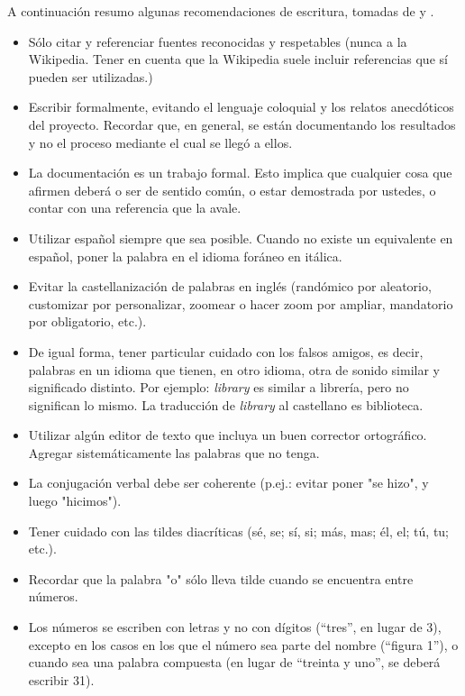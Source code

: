 \documentclass[journal,onecolumn]{IEEEtran}
\begin{document}
A continuación resumo algunas recomendaciones de escritura, tomadas de \cite{Laurenzo} y \cite{Nesmachnow2006}.

\begin{itemize}
	\item Sólo citar y referenciar fuentes reconocidas y respetables (nunca a la Wikipedia. Tener en cuenta que la Wikipedia suele incluir referencias que sí pueden ser utilizadas.)
	
	\item Escribir formalmente, evitando el lenguaje coloquial y los relatos anecdóticos del proyecto. Recordar que, en general, se están documentando los resultados y no el proceso mediante el cual se llegó a ellos.
	
	\item La documentación es un trabajo formal. Esto implica que cualquier cosa que afirmen deberá o ser de sentido común, o estar demostrada por ustedes, o contar con una referencia que la avale.
	
	\item Utilizar español siempre que sea posible. Cuando no existe un equivalente en español, poner la palabra en el idioma foráneo en itálica.
	
	\item Evitar la castellanización de palabras en inglés (randómico por aleatorio, customizar por personalizar, zoomear o hacer zoom por ampliar, mandatorio por obligatorio, etc.).
	
	\item De igual forma, tener particular cuidado con los falsos amigos, es decir, palabras en un idioma que tienen, en otro idioma, otra de sonido similar y significado distinto. Por ejemplo: \textit{library} es similar a librería, pero no significan lo mismo. La traducción de \textit{library} al castellano es biblioteca. 
	
	\item Utilizar algún editor de texto que incluya un buen corrector ortográfico. Agregar sistemáticamente las palabras que no tenga.
	
	\item La conjugación verbal debe ser coherente (p.ej.: evitar poner "se hizo", y luego "hicimos").
	
	\item Tener cuidado con las tildes diacríticas (sé, se; sí, si; más, mas; él, el; tú, tu; etc.).
	
	\item Recordar que la palabra "o" sólo lleva tilde cuando se encuentra entre números.
	\item Los números se escriben con letras y no con dígitos (``tres'', en lugar de 3), excepto en los casos en los que el número sea parte del nombre (``figura 1''), o cuando sea una palabra compuesta (en lugar de ``treinta y uno'', se deberá escribir 31).
	

\end{itemize}
\end{document}
